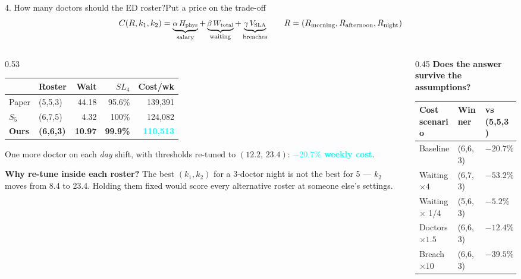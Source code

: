 \documentclass[aspectratio=169,11pt]{beamer}
\newcommand{\good}[1]{\textcolor{aqua}{\textbf{#1}}}
\begin{document}
\begin{frame}{4. How many doctors should the ED roster?}{Put a price on the trade-off}
\vspace{-0.2em}
\[\small
C(R,k_1,k_2) = \underbrace{\alpha\,H_{\text{phys}}}_{\text{salary}}
             + \underbrace{\beta\,W_{\text{total}}}_{\text{waiting}}
             + \underbrace{\gamma\,V_{\text{SLA}}}_{\text{breaches}}
\qquad R = (R_\text{morning},R_\text{afternoon},R_\text{night})
\]
\vspace{-0.6em}
\begin{columns}[T,onlytextwidth]
\begin{column}{0.53\textwidth}
{\footnotesize
\begin{tabular}{@{}llrrr@{}}
\toprule
& \textbf{Roster} & \textbf{Wait} & $SL_4$ & \textbf{Cost/wk} \\
\midrule
Paper & (5,5,3) & 44.18 & 95.6\% & 139,391 \\
$S_5$ & (6,7,5) & 4.32  & 100\%  & 124,082 \\
\textbf{Ours} & \textbf{(6,6,3)} & \textbf{10.97} & \textbf{99.9\%}
      & \good{110,513} \\
\bottomrule
\end{tabular}}
\vspace{0.6em}

{\small One more doctor on each \emph{day} shift, with thresholds re-tuned to
$(12.2,\,23.4)$: \good{$-20.7\%$ weekly cost}.}
\vspace{0.4em}

{\scriptsize\color{soft}\textbf{Why re-tune inside each roster?} The best
$(k_1,k_2)$ for a 3-doctor night is not the best for 5 --- $k_2$ moves from
8.4 to 23.4. Holding them fixed would score every alternative roster at
someone else's settings.}
\end{column}
\begin{column}{0.45\textwidth}
\vspace{0.1em}
{\footnotesize\textbf{Does the answer survive the assumptions?}}
\vspace{0.4em}

{\footnotesize
\begin{tabular}{@{}lll@{}}
\toprule
\textbf{Cost scenario} & \textbf{Winner} & \textbf{vs (5,5,3)} \\
\midrule
Baseline             & (6,6,3) & $-20.7\%$ \\
Waiting $\times 4$   & (6,7,3) & $-53.2\%$ \\
Waiting $\times$ 1/4 & (5,6,3) & $-5.2\%$ \\
Doctors $\times 1.5$ & (6,6,3) & $-12.4\%$ \\
Breach $\times 10$   & (6,6,3) & $-39.5\%$ \\
\bottomrule
\end{tabular}}
\vspace{0.7em}


\end{column}
\end{columns}
\end{frame}
\end{document}
